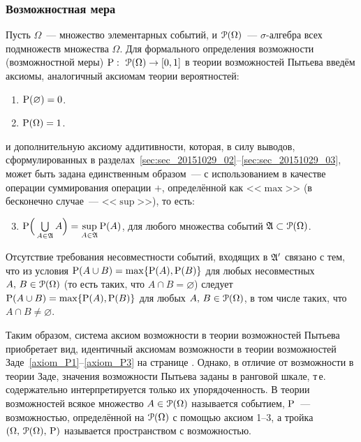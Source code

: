 \subsubsection{Возможностная мера}

Пусть $\Omega$~--- множество элементарных событий, и $\Po(\Omega)$~--- $\sigma$-алгебра всех подмножеств множества $\Omega$.
Для формального определения возможности (возможностной меры) $\P:\ \Po(\Omega)\to[0,1]$ в теории возможностей Пытьева введём аксиомы, аналогичный аксиомам теории вероятностей:
\begin{enumerate}
\item\label{item_poss_rel_1}
    $\P(\varnothing) = 0$.
\item\label{item_poss_rel_2}
    $\P(\Omega) = 1$.
\end{enumerate}
и дополнительную аксиому аддитивности, которая, в силу выводов, сформулированных в разделах~\ref{sec:sec_20151029_02}--\ref{sec:sec_20151029_03}, может быть задана единственным образом~--- с использованием в качестве операции суммирования операции $\plus$, определённой как <<$\max$>> (в бесконечно случае~--- <<$\sup$>>), то есть:
\begin{enumerate}
\setcounter{enumi}{2}
\item $\P\Big(\bigcup\limits_{A\in\Alg} A\Big) = \sup\limits_{A\in\Alg}\P(A)$, для любого множества событий $\Alg\subset\Po(\Omega)$.
\end{enumerate}
Отсутствие требования несовместности событий, входящих в $\Alg'$ связано с тем, что из условия $\P(A\cup B) = \max\{\P(A),\P(B)\}$ для любых несовместных $A,\, B\in\Po(\Omega)$ (то есть таких, что $A\cap B=\varnothing$) следует $\P(A\cup B) = \max\{\P(A),\P(B)\}$ для любых $A,\, B\in\Po(\Omega)$, в том числе таких, что $A\cap B\ne\varnothing$.

Таким образом, система аксиом возможности в теории возможностей Пытьева приобретает вид, идентичный аксиомам возможности в теории возможностей Заде~\ref{axiom_P1}--\ref{axiom_P3} на странице \pageref{axiom_P1}. Однако, в отличие от возможности в теории Заде, значения возможности Пытьева заданы в ранговой шкале, т\,е. содержательно интерпретируется только их упорядоченность. В теории возможностей всякое множество $A\in\Po(\Omega)$ называется событием, $\P$~--- возможностью, определённой на $\Po(\Omega)$ с помощью аксиом 1--3, а тройка $\OAP$ называется пространством с возможностью. %
\begin{comment}
\begin{compactenum}
\item\label{axiom_P1_Pyt} $\P(\varnothing) = 0$,
\item\label{axiom_P2_Pyt} $\P(\Omega) = 1$,
\item\label{axiom_P3_Pyt} $\P\Big(\bigcup\limits_{A\in\Alg} A\Big) = \sup\limits_{A\in\Alg}\P(A)$, для любого множества событий $\Alg\subset\Po(\Omega)$.
\end{compactenum}
\end{comment}



